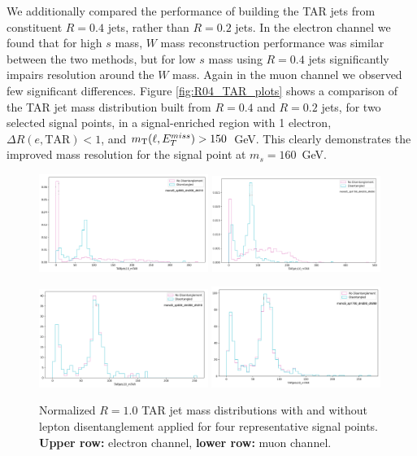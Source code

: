 We additionally compared the performance of building the TAR jets from constituent \akt $R=0.4$ jets, rather than \akt $R=0.2$ jets.
In the electron channel we found that for high $s$ mass, $W$ mass reconstruction performance was similar between the two methods, but for low $s$ mass using \akt $R=0.4$ jets significantly impairs resolution around the $W$ mass.
Again in the muon channel we observed few significant differences.
Figure \ref{fig:R04_TAR_plots} shows a comparison of the TAR jet mass distribution built from \akt $R=0.4$ and \akt $R=0.2$ jets, for two selected signal points, in a signal-enriched region with 1 electron, $\Delta R(e, \text{TAR})< 1$, and $m_{\text{T}}(\ell, E_{T}^{miss}) > 150$~GeV. This clearly demonstrates the improved mass resolution for the signal point at $m_s = 160 $~GeV.
\begin{figure}[!h]
\centering
   \includegraphics[width = 0.49\textwidth]{Figures/4/TAR/monoSww_semilep_zp500_dm200_dh310.png}
   \includegraphics[width = 0.49\textwidth]{Figures/4/TAR/monoSww_semilep_zp1700_dm200_dh260.png}

   \includegraphics[width = 0.49\textwidth]{Figures/4/TAR/mu_monoSww_semilep_zp500_dm200_dh310.png}
   \includegraphics[width = 0.49\textwidth]{Figures/4/TAR/mu_monoSww_semilep_zp1700_dm200_dh260.png}

   \caption{Normalized $R=1.0$ TAR jet mass distributions with and without lepton disentanglement applied for four representative signal points. \textbf{Upper row:} electron channel, \textbf{lower row:} muon channel.}
   \label{fig:TARdisentaglementplots}
\end{figure}

